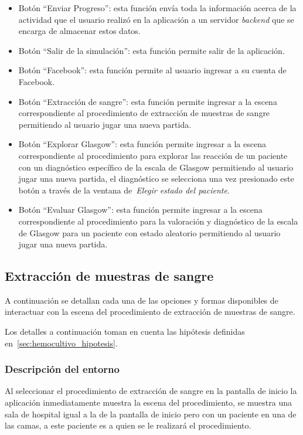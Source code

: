 \begin{itemize}
\item Botón \enquote{Enviar Progreso}: esta función envía toda la información
    acerca de la actividad que el usuario realizó en la aplicación a un servidor
    \emph{backend} que se encarga de almacenar estos datos.
\item Botón \enquote{Salir de la simulación}: esta función permite salir de la
    aplicación.
\item Botón \enquote{Facebook}: esta función permite al usuario ingresar a su
    cuenta de Facebook.
\item Botón \enquote{Extracción de sangre}: esta función permite ingresar a la
    escena correspondiente al procedimiento de extracción de muestras de sangre
    permitiendo al usuario jugar una nueva partida.
\item Botón \enquote{Explorar Glasgow}: esta función permite ingresar a la
    escena correspondiente al procedimiento para explorar las reacción de un
    paciente con un diagnóstico específico de la escala de Glasgow permitiendo
    al usuario jugar una nueva partida, el diagnóstico se selecciona una vez
    presionado este botón a través de la ventana de~\emph{Elegir estado del
        paciente}.
\item Botón \enquote{Evaluar Glasgow}: esta función permite ingresar a la escena
    correspondiente al procedimiento para la valoración y diagnóstico de la
    escala de Glasgow para un paciente con estado aleatorio permitiendo al
    usuario jugar una nueva partida.
\end{itemize}


\subsection{Extracción de muestras de sangre}

A continuación se detallan cada una de las opciones y formas disponibles de
interactuar con la escena del procedimiento de extracción de muestras de sangre.

Los detalles a continuación toman en cuenta las hipótesis definidas
en~\ref{sec:hemocultivo_hipotesis}. 

\subsubsection{Descripción del entorno}

Al seleccionar el procedimiento de extracción de sangre en la pantalla de inicio 
la aplicación inmediatamente muestra la escena del procedimiento, se muestra una 
sala de hospital igual a la de la pantalla de inicio pero con un paciente en una 
de las camas, a este paciente es a quien se le realizará el procedimiento.

